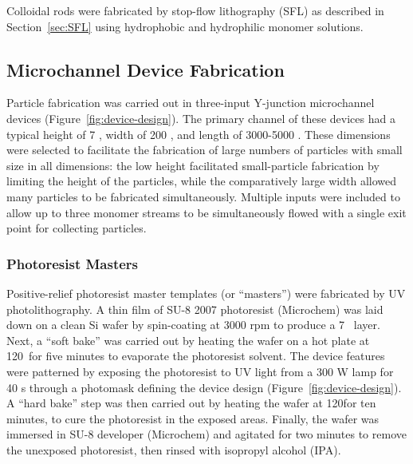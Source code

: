 Colloidal rods were fabricated by stop-flow lithography (SFL) as described in Section~\ref{sec:SFL} using
hydrophobic and hydrophilic monomer solutions.  

\subsection{Microchannel Device Fabrication}

Particle fabrication was carried out in 
three-input Y-junction microchannel devices (Figure~\ref{fig:device-design}).
The primary channel of these devices had a typical 
height of 7 \microns, width of 200 \microns, and length of 3000-5000 \microns. These dimensions were selected
to facilitate the fabrication of large numbers of particles with small size in all dimensions: the low height
facilitated small-particle fabrication by limiting the height of the particles, while the comparatively large
width allowed many particles to be fabricated simultaneously. Multiple inputs were included to allow up to three
monomer streams to be simultaneously flowed with a single exit point for collecting particles.

\subsubsection{Photoresist Masters}


Positive-relief photoresist master templates (or ``masters'') were fabricated by UV photolithography. A thin film
of SU-8 2007 photoresist (Microchem) was laid down on a clean Si wafer by spin-coating at 3000 rpm to produce a 
7 \microns~layer. Next, a ``soft bake'' was carried out by heating the wafer on a hot plate at 
120\degC~for five minutes to evaporate the photoresist solvent.  The device features were patterned by exposing the 
photoresist to UV light from a 300 W lamp for 40 s through a photomask defining the device design 
(Figure~\ref{fig:device-design}). A ``hard bake'' step
was then carried out by heating the wafer at 120\degC for ten minutes, to cure the photoresist in the exposed areas.
Finally, the wafer was immersed in SU-8 developer (Microchem) and agitated for two minutes to remove the unexposed
photoresist, then rinsed with isopropyl alcohol (IPA).

